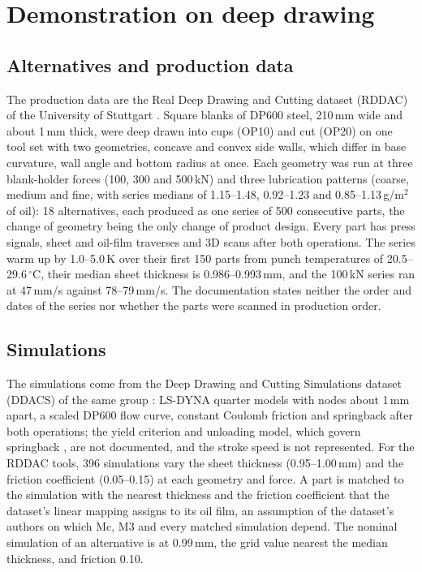 \documentclass[pdflatex,sn-basic,lineno]{sn-jnl}
\begin{document}
\section{Demonstration on deep drawing}\label{sec:demo}

\subsection{Alternatives and production data}\label{sec:data}

The production data are the Real Deep Drawing and Cutting dataset (RDDAC) of the University of Stuttgart \citep{baum2026rddac, baum2026statistical}. Square blanks of DP600 steel, 210\,mm wide and about 1\,mm thick, were deep drawn into cups (OP10) and cut (OP20) on one tool set with two geometries, concave and convex side walls, which differ in base curvature, wall angle and bottom radius at once. Each geometry was run at three blank-holder forces (100, 300 and 500\,kN) and three lubrication patterns (coarse, medium and fine, with series medians of 1.15--1.48, 0.92--1.23 and 0.85--1.13\,g/m$^2$ of oil): 18 alternatives, each produced as one series of 500 consecutive parts, the change of geometry being the only change of product design. Every part has press signals, sheet and oil-film traverses and 3D scans after both operations. The series warm up by 1.0--5.0\,K over their first 150 parts from punch temperatures of 20.5--29.6\,$^\circ$C, their median sheet thickness is 0.986--0.993\,mm, and the 100\,kN series ran at 47\,mm/s against 78--79\,mm/s. The documentation states neither the order and dates of the series nor whether the parts were scanned in production order.

\subsection{Simulations}\label{sec:sims}

The simulations come from the Deep Drawing and Cutting Simulations dataset (DDACS) of the same group \citep{baum2025ddacs, heinzelmann2025comprehensive}: LS-DYNA quarter models with nodes about 1\,mm apart, a scaled DP600 flow curve, constant Coulomb friction and springback after both operations; the yield criterion and unloading model, which govern springback \citep{yoshida2002model}, are not documented, and the stroke speed is not represented. For the RDDAC tools, 396 simulations vary the sheet thickness (0.95--1.00\,mm) and the friction coefficient (0.05--0.15) at each geometry and force. A part is matched to the simulation with the nearest thickness and the friction coefficient that the dataset's linear mapping assigns to its oil film, an assumption of the dataset's authors on which Mc, M3 and every matched simulation depend. The nominal simulation of an alternative is at 0.99\,mm, the grid value nearest the median thickness, and friction 0.10.
\end{document}
